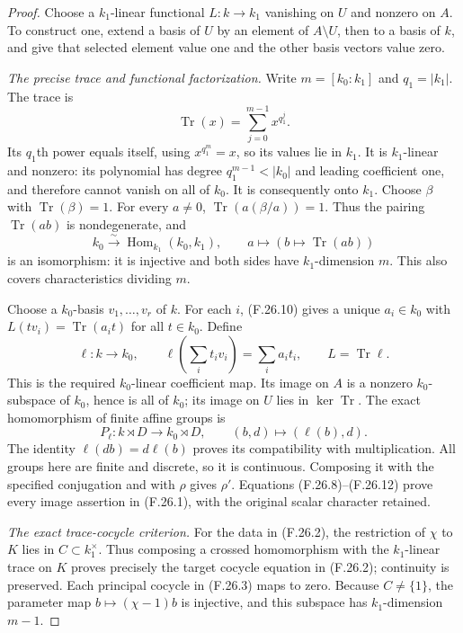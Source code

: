 \begin{proof}
Choose a $k_1$-linear functional $L:k\to k_1$
vanishing on $U$ and nonzero on $A$. To construct
one, extend a basis of $U$ by an element of
$A\setminus U$, then to a basis of $k$, and give
that selected element value one and the other
basis vectors value zero.

\emph{The precise trace and functional factorization.}
Write $m=[k_0:k_1]$ and $q_1=|k_1|$. The trace is
\[
 \operatorname{Tr}(x)=\sum_{j=0}^{m-1}x^{q_1^j}.
                                                               \tag{F.26.9}
\]
Its $q_1$th power equals itself, using
$x^{q_1^m}=x$, so its values lie in $k_1$.
It is $k_1$-linear and nonzero: its polynomial
has degree $q_1^{m-1}<|k_0|$ and leading coefficient
one, and therefore cannot vanish on all of $k_0$.
It is consequently onto $k_1$. Choose $\beta$
with $\operatorname{Tr}(\beta)=1$. For every
$a\ne0$,
$\operatorname{Tr}(a(\beta/a))=1$. Thus the pairing
$\operatorname{Tr}(ab)$ is nondegenerate, and
\[
 k_0\xrightarrow{\ \sim\ }
 \operatorname{Hom}_{k_1}(k_0,k_1),\qquad
 a\longmapsto(b\longmapsto\operatorname{Tr}(ab))
                                                               \tag{F.26.10}
\]
is an isomorphism: it is injective and both sides
have $k_1$-dimension $m$. This also covers characteristics
dividing $m$.

Choose a $k_0$-basis $v_1,\ldots,v_r$ of $k$.
For each $i$, (F.26.10) gives a unique $a_i\in k_0$
with $L(tv_i)=\operatorname{Tr}(a_it)$ for all $t\in k_0$.
Define
\[
 \ell:k\longrightarrow k_0,\qquad
 \ell\left(\sum_i t_iv_i\right)=\sum_i a_it_i,\qquad
                         L=\operatorname{Tr}\ell .
                                                               \tag{F.26.11}
\]
This is the required $k_0$-linear coefficient map.
Its image on $A$ is a nonzero $k_0$-subspace of
$k_0$, hence is all of $k_0$; its image on $U$
lies in $\ker\operatorname{Tr}$. The exact homomorphism
of finite affine groups is
\[
 P_\ell:k\rtimes D\longrightarrow k_0\rtimes D,\qquad
                         (b,d)\longmapsto(\ell(b),d).
                                                               \tag{F.26.12}
\]
The identity $\ell(db)=d\ell(b)$ proves its compatibility
with multiplication. All groups here are finite and
discrete, so it is continuous. Composing it with the
specified conjugation and with $\rho$ gives $\rho'$.
Equations (F.26.8)--(F.26.12) prove every image assertion
in (F.26.1), with the original scalar character retained.

\emph{The exact trace-cocycle criterion.}
For the data in (F.26.2), the restriction of $\chi$
to $K$ lies in $C\subset k_1^\times$. Thus composing
a crossed homomorphism with the $k_1$-linear trace
on $K$ proves precisely the target cocycle equation
in (F.26.2); continuity is preserved. Each principal
cocycle in (F.26.3) maps to zero. Because $C\ne\{1\}$,
the parameter map $b\mapsto(\chi-1)b$ is injective,
and this subspace has $k_1$-dimension $m-1$.


\end{proof}
